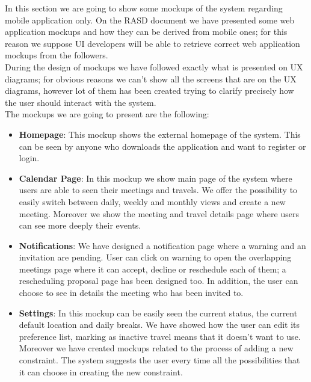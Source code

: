 In this section we are going to show some mockups of the system regarding mobile application only. On the RASD document we have presented some web application mockups and how they can be derived from mobile ones; for this reason we suppose UI developers will be able to retrieve correct web application mockups from the followers.\\
During the design of mockups we have followed exactly what is presented on UX diagrams; for obvious reasons we can't show all the screens that are on the UX diagrams, however lot of them has been created trying to clarify precisely how the user should interact with the system.\\
The mockups we are going to present are the following:
\begin{itemize}
	\item \textbf{Homepage}: This mockup shows the external homepage of the system. This can be seen by anyone who downloads the application and want to register or login.
	\item \textbf{Calendar Page}: In this mockup we show main page of the system where users are able to seen their meetings and travels. We offer the possibility to easily switch between daily, weekly and monthly views and create a new meeting. Moreover we show the meeting and travel details page where users can see more deeply their events.
	\item \textbf{Notifications}: We have designed a notification page where a warning and an invitation are pending. User can click on warning to open the overlapping meetings page where it can accept, decline or reschedule each of them; a rescheduling proposal page has been designed too. In addition, the user can choose to see in details the meeting who has been invited to.
	\item \textbf{Settings}: In this mockup can be easily seen the current status, the current default location and daily breaks. We have showed how the user can edit its preference list, marking as inactive travel means that it doesn't want to use. Moreover we have created mockups related to the process of adding a new constraint. The system suggests the user every time all the possibilities that it can choose in creating the new constraint.
\end{itemize}

